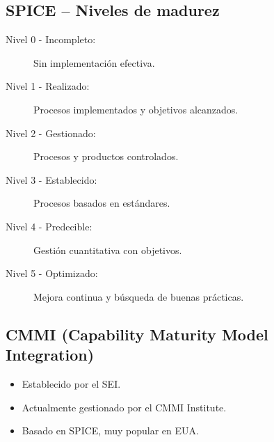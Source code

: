 \subsection{SPICE – Niveles de madurez}

\begin{description}
    \item[Nivel 0 - Incompleto:] Sin implementación efectiva.
    \item[Nivel 1 - Realizado:] Procesos implementados y objetivos alcanzados.
    \item[Nivel 2 - Gestionado:] Procesos y productos controlados.
    \item[Nivel 3 - Establecido:] Procesos basados en estándares.
    \item[Nivel 4 - Predecible:] Gestión cuantitativa con objetivos.
    \item[Nivel 5 - Optimizado:] Mejora continua y búsqueda de buenas prácticas.
\end{description}

\subsection{CMMI (Capability Maturity Model Integration)}

\begin{itemize}
    \item Establecido por el SEI\@.
    \item Actualmente gestionado por el CMMI Institute.
    \item Basado en SPICE, muy popular en EUA\@.
\end{itemize}
